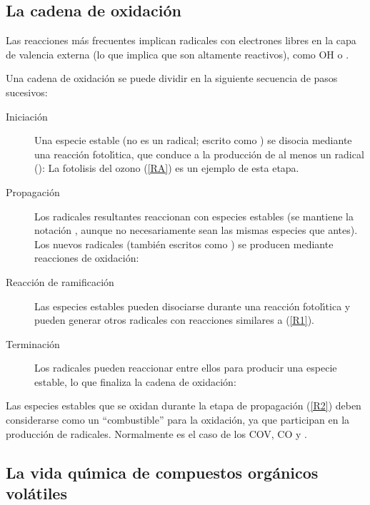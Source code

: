 \subsection{La cadena de oxidaci\'on}\label{71cox}
Las reacciones m\'as frecuentes implican radicales con electrones libres en la capa de valencia externa (lo que implica que son altamente reactivos), como OH o .

Una cadena de oxidaci\'on se puede dividir en la siguiente secuencia de pasos sucesivos:

\begin{description}
\item[Iniciaci\'on ] Una especie estable (no es un radical; escrito como ) se disocia mediante una reacci\'on fotol\'{\i}tica, que conduce a la producci\'on de al menos un radical ():
La fotolisis del ozono (\ref{RA}) es un ejemplo de esta etapa.
\item[Propagaci\'on ] Los radicales resultantes reaccionan con especies estables (se mantiene la notaci\'on , aunque no necesariamente sean las mismas especies que antes). Los nuevos radicales (tambi\'en escritos como ) se producen mediante reacciones de oxidaci\'on:
\item[Reacci\'on de ramificaci\'on]  Las especies estables pueden disociarse durante una reacci\'on fotol\'{\i}tica y pueden generar otros radicales con reacciones similares a (\ref{R1}).
\item[Terminaci\'on ] Los radicales pueden reaccionar entre ellos para producir una especie estable, lo que finaliza la cadena de oxidaci\'on:

\end{description}

Las especies estables que se oxidan durante la etapa de propagaci\'on (\ref{R2}) deben considerarse como un ``combustible''  para la oxidaci\'on, ya que participan en la producci\'on de radicales. Normalmente es el caso de los COV, CO y .

\subsection{La vida qu\'{\i}mica de compuestos org\'anicos vol\'atiles}\label{72cov}

